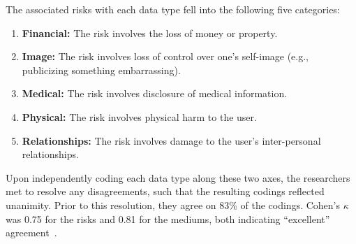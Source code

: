 The associated risks with each data type fell into the following five categories:

\begin{enumerate}
\item {\bf Financial:} The risk involves the loss of money or property.
\item {\bf Image:} The risk involves loss of control over one's self-image (e.g., publicizing something embarrassing).
\item {\bf Medical:} The risk involves disclosure of medical information.
\item {\bf Physical:} The risk involves physical harm to the user.
\item {\bf Relationships:} The risk involves damage to the user's inter-personal relationships.
\end{enumerate}

Upon independently coding each data type along these two axes, the researchers met to resolve any disagreements, such that the resulting codings reflected unanimity. Prior to this resolution, they agree on 83\% of the codings. Cohen's $\kappa$ was 0.75 for the risks and 0.81 for the mediums, both indicating ``excellent'' agreement~\cite{Fleiss2003}.










